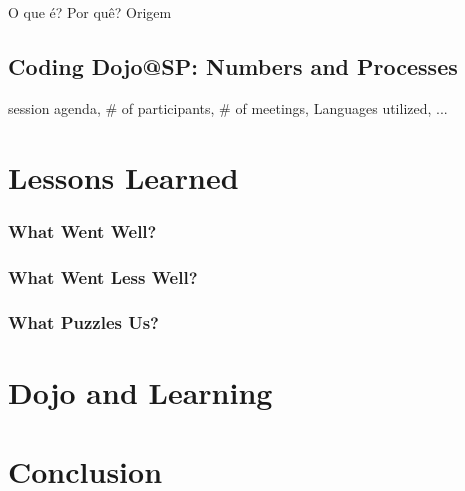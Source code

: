 \documentclass[times, 10pt,twocolumn]{article}
\begin{document}
O que é?\cite{DojoWiki} Por quê? Origem\cite{DaveThomas}

\subsection{Coding Dojo@SP: Numbers and Processes}\label{subsec:dojosp}

session agenda, \# of participants, \# of meetings, Languages utilized, ...

\section{Lessons Learned}\label{sec:lessons_learned}

\subsubsection{What Went Well?}\label{ssub:well}

\subsubsection{What Went Less Well?}\label{ssub:less_well}

\subsubsection{What Puzzles Us?}\label{ssub:puzzles}

\section{Dojo and Learning}\label{sec:dojo_and_learning}

\section{Conclusion}\label{sec:conclusion}



\end{document}
